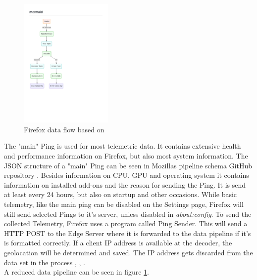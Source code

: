         \begin{figure}
            \centering
            \includegraphics[clip, trim=0.5cm 8cm 8cm 3.5cm, width=0.4\textwidth]{latex/figures/firefox_telemetry_graph}
            \caption[Firefox data flow]{Firefox data flow based on  \cite{mozilla_overview_2020}}
            \label{fig:moz_data_flow}
        \end{figure}
        
        The "main" Ping is used for most telemetric data. It contains extensive health and performance information on Firefox, but also most system information. The JSON structure of a "main" Ping can be seen in Mozillas pipeline schema GitHub repository \cite{mozilla_mozilla-servicesmozilla-pipeline-schemas_2020}. 
        Besides information on CPU, GPU and operating system it contains information on installed add-ons and the reason for sending the Ping.
        It is send at least every 24 hours, but also on startup and other occasions. While basic telemetry, like the main ping can be disabled on the Settings page, Firefox will still send selected Pings to it's server, unless disabled in \textit{about:config}.
        To send the collected Telemetry, Firefox uses a program called Ping Sender.
        This will send a HTTP POST to the Edge Server where it is forwarded to the data pipeline if it's is formatted correctly.
        If a client IP address is available at the decoder, the geolocation will be determined and saved.
        The IP address gets discarded from the data set in the process \cite{mozilla_overview_2020}, \cite{mozilla_http_2020}, \cite{firefox_ping_nodate}.\\
        A reduced data pipeline can be seen in figure \ref{fig:moz_data_flow}.
        
